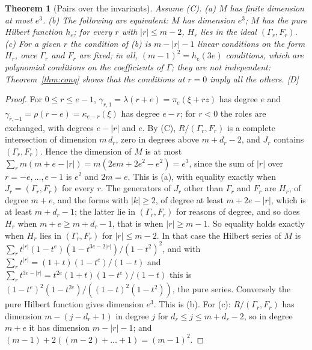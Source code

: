 \documentclass[11pt]{article}
\newtheorem{thmletter}{Theorem}
\theoremstyle{definition}
\theoremstyle{remark}
\begin{document}
\begin{thmletter}[Pairs over the invariants]\label{thm:inv}
Assume (C). (a) $M$ has finite dimension at most $e^3$. (b) The following are equivalent: $M$ has dimension $e^3$; $M$ has the pure Hilbert function $h_e$; for every $r$ with $|r|\le m-2$, $H_r$ lies in the ideal $(\Gamma_r,F_r)$. (c) For a given $r$ the condition of (b) is $m-|r|-1$ linear conditions on the form $H_r$, once $\Gamma_r$ and $F_r$ are fixed; in all, $(m-1)^2=h_e(3e)$ conditions, which are polynomial conditions on the coefficients of $\Gamma$; they are not independent: Theorem~\ref{thm:cong} shows that the conditions at $r=0$ imply all the others. [D]
\end{thmletter}
\begin{proof}
For $0\le r\le e-1$, $\gamma_{r,1}=\lambda(r+e)=\pi_e(\xi+rz)$ has degree $e$ and $\gamma_{r,-1}=\rho(r-e)=\kappa_{e-r}(\xi)$ has degree $e-r$; for $r<0$ the roles are exchanged, with degrees $e-|r|$ and $e$. By (C), $R/(\Gamma_r,F_r)$ is a complete intersection of dimension $m\,d_r$, zero in degrees above $m+d_r-2$, and $J_r$ contains $(\Gamma_r,F_r)$. Hence the dimension of $M$ is at most $\sum_rm(m+e-|r|)=m(2em+2e^2-e^2)=e^3$, since the sum of $|r|$ over $r=-e,\dots,e-1$ is $e^2$ and $2m=e$. This is (a), with equality exactly when $J_r=(\Gamma_r,F_r)$ for every $r$. The generators of $J_r$ other than $\Gamma_r$ and $F_r$ are $H_r$, of degree $m+e$, and the forms with $|k|\ge2$, of degree at least $m+2e-|r|$, which is at least $m+d_r-1$; the latter lie in $(\Gamma_r,F_r)$ for reasons of degree, and so does $H_r$ when $m+e\ge m+d_r-1$, that is when $|r|\ge m-1$. So equality holds exactly when $H_r$ lies in $(\Gamma_r,F_r)$ for $|r|\le m-2$. In that case the Hilbert series of $M$ is $\sum_rt^{|r|}(1-t^e)(1-t^{3e-2|r|})/(1-t^2)^2$, and with $\sum_rt^{|r|}=(1+t)(1-t^e)/(1-t)$ and $\sum_rt^{3e-|r|}=t^{2e}(1+t)(1-t^e)/(1-t)$ this is $(1-t^e)^2(1-t^{2e})/((1-t)^2(1-t^2))$, the pure series. Conversely the pure Hilbert function gives dimension $e^3$. This is (b). For (c): $R/(\Gamma_r,F_r)$ has dimension $m-(j-d_r+1)$ in degree $j$ for $d_r\le j\le m+d_r-2$, so in degree $m+e$ it has dimension $m-|r|-1$; and $(m-1)+2((m-2)+\dots+1)=(m-1)^2$.
\end{proof}
\end{document}
